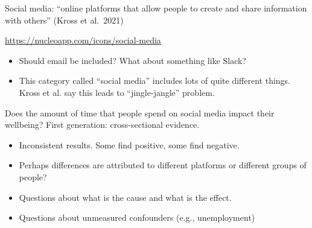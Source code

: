 \documentclass[aspectratio=169]{beamer}
\begin{document}
\begin{frame}

Social media: ``online platforms that allow people to create and share information with others'' (Kross et al.\ 2021)\pause

\begin{center}
\end{center}
{\tiny \url{https://nucleoapp.com/icons/social-media}}

\begin{itemize}
\item Should email be included?  What about something like Slack? \pause
\item This category called ``social media'' includes lots of quite different things. Kross et al. say this leads to ``jingle-jangle'' problem.
\end{itemize}

\end{frame}
\begin{frame}

Does the amount of time that people spend on social media impact their wellbeing?  First generation: cross-sectional evidence. 
\begin{itemize}
\item Inconsistent results.  Some find positive, some find negative.  
\item Perhaps differences are attributed to different platforms or different groups of people? \pause
\item Questions about what is the cause and what is the effect.\pause
\item Questions about unmeasured confounders (e.g., unemployment) \pause
\end{itemize}

\end{frame}
\end{document}

